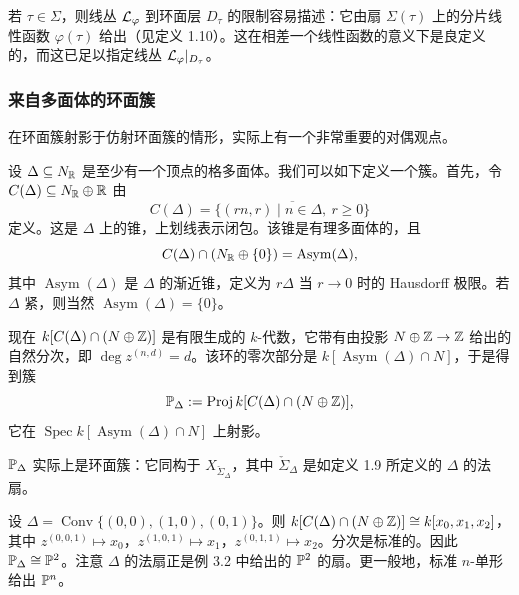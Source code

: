 若 $\tau\in\Sigma$，则线丛 $\mathcal{L}_\varphi$ 到环面层 $D_\tau$ 的限制容易描述：它由扇 $\Sigma(\tau)$ 上的分片线性函数 $\varphi(\tau)$ 给出（见定义 1.10）。这在相差一个线性函数的意义下是良定义的，而这已足以指定线丛 $\mathcal{L}_\varphi|_{D_\tau}$。


\subsubsection{来自多面体的环面簇}

在环面簇射影于仿射环面簇的情形，实际上有一个非常重要的对偶观点。

设 $\Delta\subseteq N_{\mathbb{R}}$ 是至少有一个顶点的格多面体。我们可以如下定义一个簇。首先，令 $C(\Delta)\subseteq N_{\mathbb{R}}\oplus\mathbb{R}$ 由
\[
  C(\Delta)=\overline{\{(rn,r)\mid n\in\Delta,\ r\ge 0\}}
\]
定义。这是 $\Delta$ 上的锥，上划线表示闭包。该锥是有理多面体的，且
\[
  C(\Delta)\cap(N_{\mathbb{R}}\oplus\{0\})=\operatorname{Asym}(\Delta),
\]
其中 $\operatorname{Asym}(\Delta)$ 是 $\Delta$ 的渐近锥，定义为 $r\Delta$ 当 $r\to 0$ 时的 Hausdorff 极限。若 $\Delta$ 紧，则当然 $\operatorname{Asym}(\Delta)=\{0\}$。


现在 $k[C(\Delta)\cap(N\oplus\mathbb{Z})]$ 是有限生成的 $k$-代数，它带有由投影 $N\oplus\mathbb{Z}\to\mathbb{Z}$ 给出的自然分次，即 $\deg z^{(n,d)}=d$。该环的零次部分是 $k[\operatorname{Asym}(\Delta)\cap N]$，于是得到簇
\[
  \mathbb{P}_\Delta:=\operatorname{Proj}k[C(\Delta)\cap(N\oplus\mathbb{Z})],
\]
它在 $\operatorname{Spec} k[\operatorname{Asym}(\Delta)\cap N]$ 上射影。

$\mathbb{P}_\Delta$ 实际上是环面簇：它同构于 $X_{\check\Sigma_\Delta}$，其中 $\check\Sigma_\Delta$ 是如定义 1.9 所定义的 $\Delta$ 的法扇。

\begin{example}
设 $\Delta=\operatorname{Conv}\{(0,0),(1,0),(0,1)\}$。则 $k[C(\Delta)\cap(N\oplus\mathbb{Z})]\cong k[x_0,x_1,x_2]$，其中 $z^{(0,0,1)}\mapsto x_0$，$z^{(1,0,1)}\mapsto x_1$，$z^{(0,1,1)}\mapsto x_2$。分次是标准的。因此 $\mathbb{P}_\Delta\cong\mathbb{P}^2$。注意 $\Delta$ 的法扇正是例 3.2 中给出的 $\mathbb{P}^2$ 的扇。更一般地，标准 $n$-单形给出 $\mathbb{P}^n$。
\end{example}

